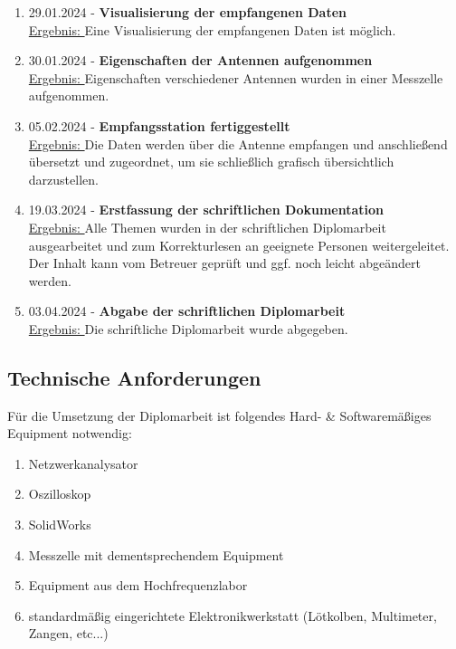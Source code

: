 \begin{enumerate}
	\item 29.01.2024 - \textbf{Visualisierung der empfangenen Daten}\\
	\underline{Ergebnis: }Eine Visualisierung der empfangenen Daten ist möglich. 
	
	\item 30.01.2024 - \textbf{Eigenschaften der Antennen aufgenommen}\\
	\underline{Ergebnis: }Eigenschaften verschiedener Antennen wurden in einer Messzelle aufgenommen. 
	
	\item 05.02.2024 - \textbf{Empfangsstation fertiggestellt}\\
	\underline{Ergebnis: } Die Daten werden über die Antenne empfangen und anschließend übersetzt und 
	zugeordnet, um sie schließlich grafisch übersichtlich darzustellen.
	
	\item 19.03.2024 - \textbf{Erstfassung der schriftlichen Dokumentation}\\
	\underline{Ergebnis: } Alle Themen wurden in der schriftlichen Diplomarbeit ausgearbeitet und zum 
	Korrekturlesen an geeignete Personen weitergeleitet. Der Inhalt kann vom Betreuer geprüft und 
	ggf. noch leicht abgeändert werden.
	
	\item 03.04.2024 - \textbf{Abgabe der schriftlichen Diplomarbeit}\\
	\underline{Ergebnis: } Die schriftliche Diplomarbeit wurde abgegeben. 
\end{enumerate}

\subsection{Technische Anforderungen}
Für die Umsetzung der Diplomarbeit ist folgendes Hard- \& Softwaremäßiges Equipment notwendig:
\begin{enumerate}
	\item Netzwerkanalysator
	\item Oszilloskop
	\item SolidWorks
	\item Messzelle mit dementsprechendem Equipment
	\item Equipment aus dem Hochfrequenzlabor
	\item standardmäßig eingerichtete Elektronikwerkstatt (Lötkolben, Multimeter, Zangen, etc...)
\end{enumerate}

